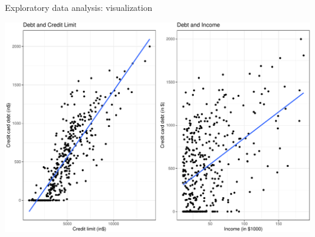 \documentclass[
  ignorenonframetext,
]{beamer}
\begin{document}
\begin{frame}{Exploratory data analysis: visualization}
\protect\hypertarget{exploratory-data-analysis-visualization-1}{}
\begin{center}\includegraphics[width=0.9\linewidth,height=0.9\textheight]{Week5_Lect_files/figure-beamer/unnamed-chunk-43-1} \end{center}
\end{frame}
\end{document}
